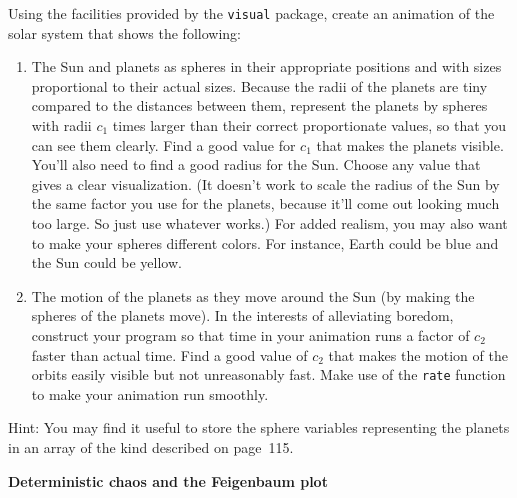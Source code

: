 \documentclass[12pt]{article}
\begin{document}
\begin{exercises}
\begin{center}
\begin{tabular}{l|ccc}
\end{tabular}
\end{center}

\smallskip\noindent
Using the facilities provided by the \verb|visual| package, create an
animation of the solar system that shows the following:
\begin{enumerate}\setlength{\itemsep}{0pt}
\item The Sun and planets as spheres in their appropriate positions and
  with sizes proportional to their actual sizes.  Because the radii of the
  planets are tiny compared to the distances between them, represent the
  planets by spheres with radii $c_1$ times larger than their correct
  proportionate values, so that you can see them clearly.  Find a good
  value for $c_1$ that makes the planets visible.  You'll also need to find
  a good radius for the Sun.  Choose any value that gives a clear
  visualization.  (It doesn't work to scale the radius of the Sun by the
  same factor you use for the planets, because it'll come out looking much
  too large.  So just use whatever works.)  For added realism, you may also
  want to make your spheres different colors.  For instance, Earth could be
  blue and the Sun could be yellow.
\item The motion of the planets as they move around the Sun (by making the
  spheres of the planets move).  In the interests of alleviating boredom,
  construct your program so that time in your animation runs a factor of
  $c_2$ faster than actual time.  Find a good value of $c_2$ that makes the
  motion of the orbits easily visible but not unreasonably fast.  Make use
  of the \verb|rate| function to make your animation run smoothly.
\end{enumerate}
Hint: You may find it useful to store the sphere variables representing the
planets in an array of the kind described on page~115.

\exercise \textbf{Deterministic chaos and the Feigenbaum plot}


\end{exercises}
\end{document}
